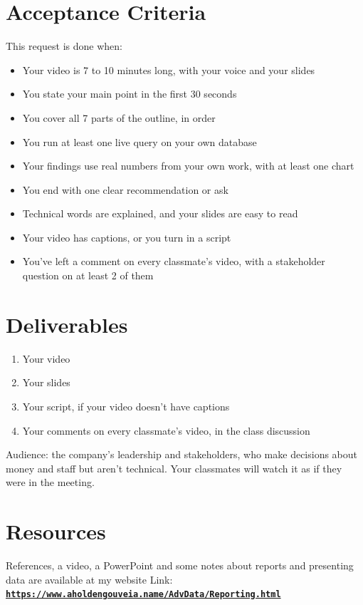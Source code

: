 \documentclass[12pt]{article}
\begin{document}
\section*{Acceptance Criteria}
This request is done when:
\begin{itemize}
    \item Your video is 7 to 10 minutes long, with your voice and your slides
    \item You state your main point in the first 30 seconds
    \item You cover all 7 parts of the outline, in order
    \item You run at least one live query on your own database
    \item Your findings use real numbers from your own work, with at least one chart
    \item You end with one clear recommendation or ask
    \item Technical words are explained, and your slides are easy to read
    \item Your video has captions, or you turn in a script
    \item You've left a comment on every classmate's video, with a stakeholder question on at least 2 of them
\end{itemize}

\section*{Deliverables}
\begin{enumerate}
    \item Your video
    \item Your slides
    \item Your script, if your video doesn't have captions
    \item Your comments on every classmate's video, in the class discussion
\end{enumerate}

Audience: the company's leadership and stakeholders, who make decisions about money and staff but aren't technical. Your classmates will watch it as if they were in the meeting.

\section*{Resources}
References, a video, a PowerPoint and some notes about reports and presenting data are available at my website
Link: \href{https://www.aholdengouveia.name/AdvData/Reporting.html}{\textbf{\nolinkurl{https://www.aholdengouveia.name/AdvData/Reporting.html}}}
\end{document}
